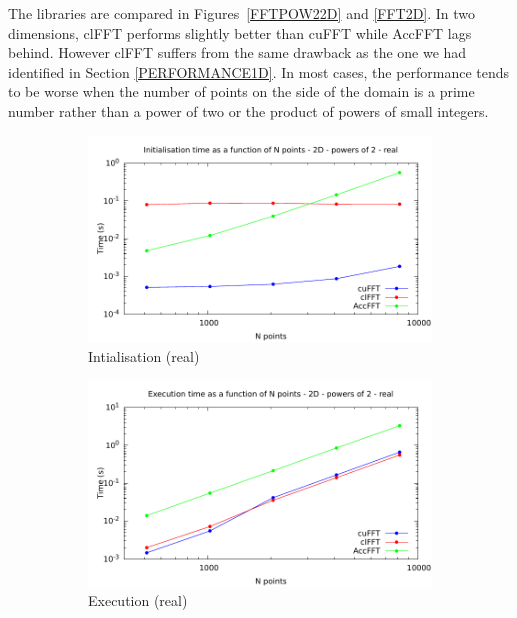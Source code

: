 \documentclass[12pt, a4paper]{article}
\begin{document}
The libraries are compared in Figures~\ref{FFTPOW22D} and \ref{FFT2D}.
In two dimensions, clFFT performs slightly better than cuFFT while
AccFFT lags behind. However clFFT suffers from the same drawback as
the one we had identified in Section \ref{PERFORMANCE1D}. In most
cases, the performance tends to be worse when
the number of points on the side of the domain is a prime number
rather than a power of two or the product of powers of small
integers.



\begin{figure}[H]
\captionsetup{width=0.8\linewidth}
\centering
\begin{subfigure}{.5\textwidth}
\centering
\includegraphics[width=.9\linewidth]{graphs/fft-2d-pow2-r-init.pdf}
\caption{Intialisation (real)}
\label{FFTPOW22DRI}
\end{subfigure}%
\begin{subfigure}{.5\textwidth}
\centering
\includegraphics[width=.9\linewidth]{graphs/fft-2d-pow2-r-exec.pdf}
\caption{Execution (real)}
\label{FFTPOW22DRE}
\end{subfigure}\\
\begin{subfigure}{.5\textwidth}

\end{subfigure}
\end{figure}
\end{document}
